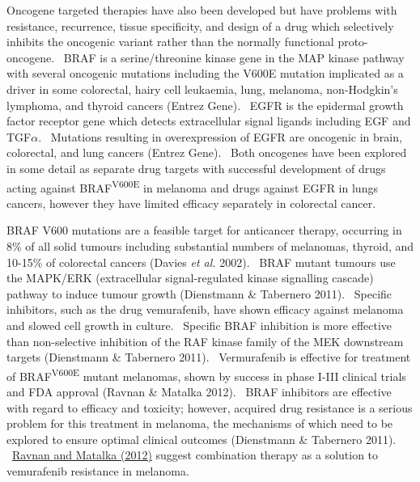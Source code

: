 Oncogene targeted therapies have also been developed but have problems
with resistance, recurrence, tissue specificity, and design of a drug
which selectively inhibits the oncogenic variant rather than the
normally functional proto-oncogene. \ BRAF is a serine/threonine kinase
gene in the MAP kinase pathway with several oncogenic mutations
including the V600E mutation implicated as a driver in some colorectal,
hairy cell leukaemia, lung, melanoma, non-Hodgkin{\textquoteright}s
lymphoma, and thyroid cancers (Entrez Gene). \ EGFR is the epidermal
growth factor receptor gene which detects extracellular signal ligands
including EGF and TGF$\alpha $. \ Mutations resulting in overexpression
of EGFR are oncogenic in brain, colorectal, and lung cancers (Entrez
Gene). \ Both oncogenes have been explored in some detail as separate
drug targets with successful development of drugs acting against
BRAF\textsuperscript{V600E} in melanoma and drugs against EGFR in lungs
cancers, however they have limited efficacy separately in colorectal
cancer. \ 


BRAF V600 mutations are a feasible target for anticancer therapy,
occurring in 8\% of all solid tumours including substantial numbers of
melanomas, thyroid, and 10-15\% of colorectal cancers (Davies\textit{
et al.} 2002). \ BRAF mutant tumours use the MAPK/ERK (extracellular
signal-regulated kinase signalling cascade) pathway to induce tumour
growth (Dienstmann \& Tabernero 2011). \ Specific inhibitors, such as
the drug vemurafenib, have shown efficacy against melanoma and slowed
cell growth in culture. \ Specific BRAF inhibition is more effective
than non-selective inhibition of the RAF kinase family of the MEK
downstream targets (Dienstmann \& Tabernero 2011). \ Vermurafenib is
effective for treatment of BRAF\textsuperscript{V600E} mutant
melanomas, shown by success in phase I-III clinical trials and FDA
approval (Ravnan \& Matalka 2012). \ BRAF inhibitors are effective with
regard to efficacy and toxicity; however, acquired drug resistance is a
serious problem for this treatment in melanoma, the mechanisms of which
need to be explored to ensure optimal clinical outcomes (Dienstmann \&
Tabernero 2011). \ \hyperlink{ENREF82}{Ravnan and Matalka (2012)}
suggest combination therapy as a solution to vemurafenib resistance in
melanoma. \ 


